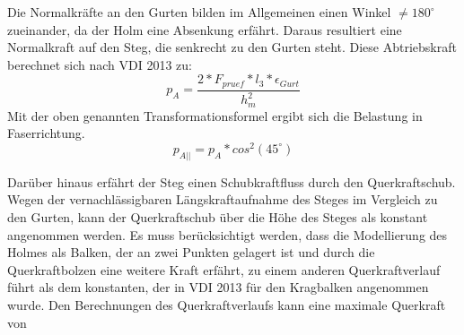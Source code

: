 Die Normalkräfte an den Gurten bilden im Allgemeinen einen Winkel $ \neq180^{\circ} $ zueinander, da der Holm eine Absenkung erfährt. Daraus resultiert eine Normalkraft auf den Steg, die senkrecht zu den Gurten steht. Diese Abtriebskraft berechnet sich nach VDI 2013 zu:
\begin{equation}
	p_{A}=\frac{2*F_{pruef}*l_{3}*\epsilon_{Gurt}}{h_{m}^{2}}
\end{equation}
 Mit der oben genannten Transformationsformel ergibt sich die Belastung in Faserrichtung.
 \begin{equation}
 	p_{A||}=p_{A}*cos^{2}\left(45^{\circ} \right)
 \end{equation} 

Darüber hinaus erfährt der Steg einen Schubkraftfluss durch den Querkraftschub. Wegen der vernachlässigbaren Längskraftaufnahme des Steges im Vergleich zu den Gurten, kann der Querkraftschub über die Höhe des Steges als konstant angenommen werden. Es muss berücksichtigt werden, dass die Modellierung des Holmes als Balken, der an zwei Punkten gelagert ist und durch die Querkraftbolzen eine weitere Kraft erfährt, zu einem anderen Querkraftverlauf führt als dem konstanten, der in VDI 2013 für den Kragbalken angenommen wurde. Den Berechnungen des Querkraftverlaufs kann eine maximale Querkraft von